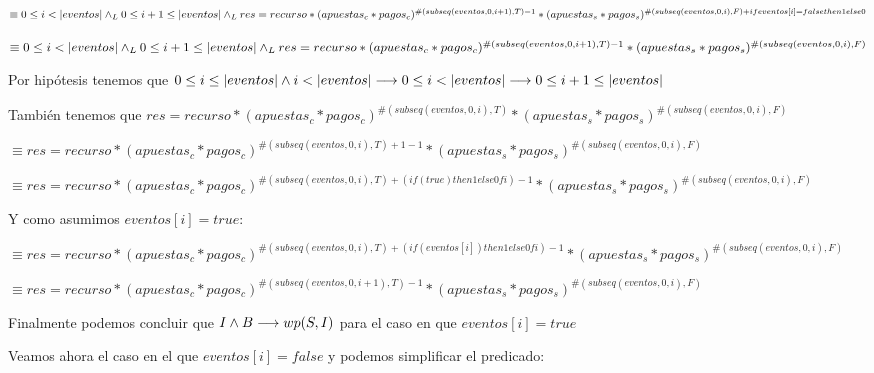 \documentclass[10pt,a4paper]{article}
\begin{document}
$\equiv 0 \leq i < \longitud{eventos} \yLuego 0 \leq i + 1 \leq \longitud{eventos} \yLuego 
\newline res = recurso*(apuestas_c * pagos_c)^{\#(subseq(eventos, 0, i + 1), T) - 1}*(apuestas_s * pagos_s)^{\#(subseq(eventos, 0, i), F) + if eventos[i] = false then 1 else 0}$
\vspace{8pt}

$\equiv 0 \leq i < \longitud{eventos} \yLuego 0 \leq i + 1 \leq \longitud{eventos} \yLuego 
\newline res = recurso*(apuestas_c * pagos_c)^{\#(subseq(eventos, 0, i + 1), T) - 1}*(apuestas_s * pagos_s)^{\#(subseq(eventos, 0, i), F)}$
\vspace{8pt}

Por hipótesis tenemos que $0 \leq i \leq |eventos| \land i < |eventos| \longrightarrow 0 \leq i < |eventos| \longrightarrow 0 \leq i + 1 \leq |eventos|$
\vspace{8pt}

También tenemos que $res = recurso*(apuestas_c * pagos_c)^{\#(subseq(eventos, 0, i), T)}*(apuestas_s * pagos_s)^{\#(subseq(eventos, 0, i), F)}$
\vspace{8pt}

$\equiv res = recurso*(apuestas_c * pagos_c)^{\#(subseq(eventos, 0, i), T) + 1 - 1}*(apuestas_s * pagos_s)^{\#(subseq(eventos, 0, i), F)}$
\vspace{8pt}

$\equiv res = recurso*(apuestas_c * pagos_c)^{\#(subseq(eventos, 0, i), T) + (if (true) then 1 else 0 fi) - 1}*(apuestas_s * pagos_s)^{\#(subseq(eventos, 0, i), F)}$
\vspace{8pt}

Y como asumimos $eventos[i] = true:$
\vspace{8pt}

$\equiv res = recurso*(apuestas_c * pagos_c)^{\#(subseq(eventos, 0, i), T) + (if (eventos[i]) then 1 else 0 fi) - 1}*(apuestas_s * pagos_s)^{\#(subseq(eventos, 0, i), F)}$
\vspace{8pt}

$\equiv res = recurso*(apuestas_c * pagos_c)^{\#(subseq(eventos, 0, i + 1), T) - 1}*(apuestas_s * pagos_s)^{\#(subseq(eventos, 0, i), F)}$
\vspace{8pt}

Finalmente podemos concluir que $I \land B \longrightarrow wp(S,I)$ para el caso en que $eventos[i] = true$
\vspace{8pt}

Veamos ahora el caso en el que $eventos[i] = false$ y podemos simplificar el predicado:
\vspace{8pt}
\end{document}
